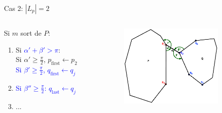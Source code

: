 \documentclass{beamer}
\begin{document}
\begin{frame}{Cas 2: $|L_p| = 2$}
	\begin{columns}[c]
	\begin{column}[T]{.5\textwidth}
		Si $m$ sort de $P$:
		\begin{enumerate}
		\item Si \textcolor{blue}{$\alpha' + \beta' > \pi$}: \\
			\hspace{0.3cm} Si $\alpha' \geq \frac{\pi}{2}$, $p_{\text{first}} \leftarrow p_{2}$\\
			\hspace{0.3cm} \textcolor{blue}{Si $\beta' \geq \frac{\pi}{2}$, $q_{\text{first}} \leftarrow q_{j}$}
		\item \textcolor{blue}{Si $\beta'' \geq \frac{\pi}{2}$: $q_{\text{last}} \leftarrow q_{j}$}
		\item ...
		\end{enumerate}
	\end{column}
	\begin{column}[T]{.5\textwidth}
		\includegraphics[width=5cm]{dmin2_2.eps}
	\end{column}
	\end{columns}
\end{frame}
\end{document}

